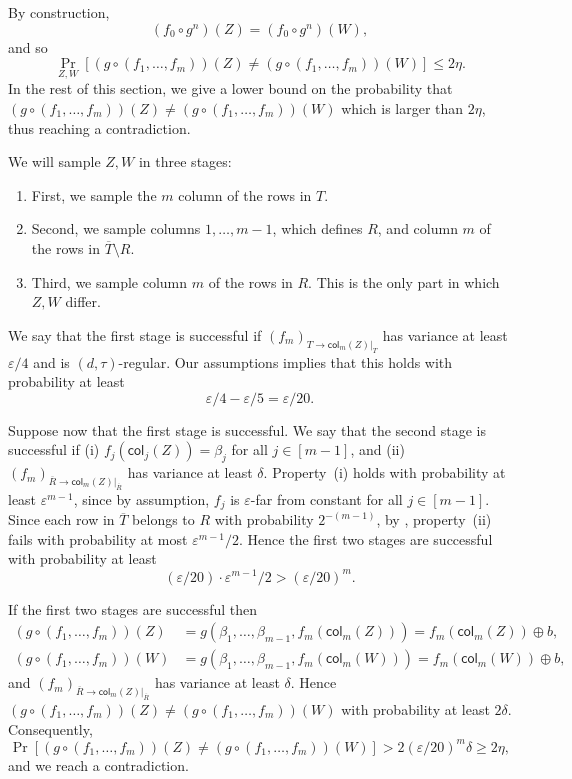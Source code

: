\documentclass{article}
\theoremstyle{definition}
\theoremstyle{remark}
\providecommand{\col}{\mathsf{col}}
\providecommand{\h}{g}
\newcommand\eps{\varepsilon}
\renewcommand\epsilon{\eps}
\renewcommand\geq{\geqslant}
\renewcommand\leq{\leqslant}
\begin{document}
By construction,
\[
 (f_0 \circ g^n)(Z) = (f_0 \circ g^n)(W),
\]
and so
\[
 \Pr_{Z,W}[(\h \circ (f_1,\ldots,f_m))(Z) \neq (\h \circ (f_1,\ldots,f_m))(W)] \leq 2\eta.
\]
In the rest of this section, we give a lower bound on the probability that $(\h \circ (f_1,\ldots,f_m))(Z) \neq (\h \circ (f_1,\ldots,f_m))(W)$ which is larger than $2\eta$, thus reaching a contradiction.

We will sample $Z,W$ in three stages:

\begin{enumerate}
    \item First, we sample the $m$ column of the rows in $T$.
    \item Second, we sample columns $1,\ldots,m-1$, which defines $R$, and column $m$ of the rows in $\overline{T} \setminus R$.
    \item Third, we sample column $m$ of the rows in $R$. This is the only part in which $Z,W$ differ.
\end{enumerate}

We say that the first stage is successful if $(f_m)_{T \to \col_m(Z)|_T}$ has variance at least $\epsilon/4$ and is $(d,\tau)$-regular. Our assumptions implies that this holds with probability at least
\[
 \epsilon/4 - \epsilon/5 = \epsilon/20.
\]

Suppose now that the first stage is successful.
We say that the second stage is successful if (i) $f_j(\col_j(Z)) = \beta_j$ for all $j \in [m-1]$, and (ii) $(f_m)_{\overline{R} \to \col_m(Z)|_{\overline{R}}}$ has variance at least $\delta$. Property~(i) holds with probability at least $\epsilon^{m-1}$, since by assumption, $f_j$ is $\epsilon$-far from constant for all $j \in [m-1]$. Since each row in $\overline{T}$ belongs to $R$ with probability $2^{-(m-1)}$, by , property~(ii) fails with probability at most $\epsilon^{m-1}/2$. Hence the first two stages are successful with probability at least
\[
 (\epsilon/20) \cdot \epsilon^{m-1}/2 > (\epsilon/20)^m.
\]

If the first two stages are successful then
\begin{align*}
 (\h \circ (f_1,\ldots,f_m))(Z) &= \h(\beta_1,\ldots,\beta_{m-1},f_m(\col_m(Z))) = f_m(\col_m(Z)) \oplus b, \\
 (\h \circ (f_1,\ldots,f_m))(W) &= \h(\beta_1,\ldots,\beta_{m-1},f_m(\col_m(W))) = f_m(\col_m(W)) \oplus b,
\end{align*}
and $(f_m)_{\overline{R} \to \col_m(Z)|_{\overline{R}}}$ has variance at least $\delta$. Hence $(\h \circ (f_1,\ldots,f_m))(Z) \neq (\h \circ (f_1,\ldots,f_m))(W)$ with probability at least $2\delta$. Consequently,
\[
 \Pr[(\h \circ (f_1,\ldots,f_m))(Z) \neq (\h \circ (f_1,\ldots,f_m))(W)] > 2(\epsilon/20)^m\delta \geq 2\eta,
\]
and we reach a contradiction.
\end{document}
